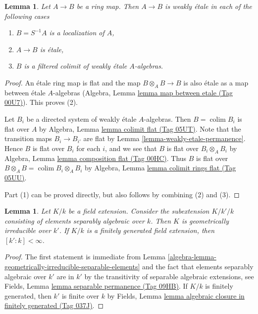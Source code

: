 \documentclass{amsart}
\theoremstyle{plain}
\newtheorem{lemma}[subsection]{Lemma}
\theoremstyle{definition}
\theoremstyle{remark}
\numberwithin{equation}{subsection}
\def\colim{\mathop{\mathrm{colim}}\nolimits}
\begin{document}
\begin{lemma}
\label{lemma-when-weakly-etale}
Let $A \to B$ be a ring map. Then $A \to B$ is weakly \'etale in each
of the following cases
\begin{enumerate}
\item $B = S^{-1}A$ is a localization of $A$,
\item $A \to B$ is \'etale,
\item $B$ is a filtered colimit of weakly \'etale $A$-algebras.
\end{enumerate}
\end{lemma}

\begin{proof}
An \'etale ring map is flat and the map $B \otimes_A B \to B$ is
also \'etale as a map between \'etale $A$-algebras
(Algebra, Lemma \href{https://stacks.math.columbia.edu/tag/00U7}{lemma map between etale (Tag 00U7)}).
This proves (2).

\medskip\noindent
Let $B_i$ be a directed system of weakly \'etale $A$-algebras.
Then $B = \colim B_i$ is flat over $A$ by
Algebra, Lemma \href{https://stacks.math.columbia.edu/tag/05UT}{lemma colimit flat (Tag 05UT)}.
Note that the transition maps $B_i \to B_{i'}$ are flat
by Lemma \ref{lemma-weakly-etale-permanence}.
Hence $B$ is flat over $B_i$ for each $i$, and we see that $B$ is flat
over $B_i \otimes_A B_i$ by
Algebra, Lemma \href{https://stacks.math.columbia.edu/tag/00HC}{lemma composition flat (Tag 00HC)}.
Thus $B$ is flat over $B \otimes_A B = \colim B_i \otimes_A B_i$
by Algebra, Lemma \href{https://stacks.math.columbia.edu/tag/05UU}{lemma colimit rings flat (Tag 05UU)}.

\medskip\noindent
Part (1) can be proved directly, but also follows by combining
(2) and (3).
\end{proof}


\begin{lemma}
\label{algebra-lemma-make-geometrically-irreducible}
Let $K/k$ be a field extension. Consider the subextension $K/k'/k$ consisting
of elements separably algebraic over $k$. Then $K$ is geometrically irreducible
over $k'$. If $K/k$ is a finitely generated field extension, then
$[k' : k] < \infty$.
\end{lemma}

\begin{proof}
The first statement is immediate from
Lemma \ref{algebra-lemma-geometrically-irreducible-separable-elements}
and the fact that elements separably algebraic over $k'$
are in $k'$ by the transitivity of separable algebraic
extensions, see Fields, Lemma \href{https://stacks.math.columbia.edu/tag/09HB}{lemma separable permanence (Tag 09HB)}.
If $K/k$ is finitely generated, then $k'$ is finite over $k$ by
Fields, Lemma \href{https://stacks.math.columbia.edu/tag/037J}{lemma algebraic closure in finitely generated (Tag 037J)}.
\end{proof}
\end{document}
